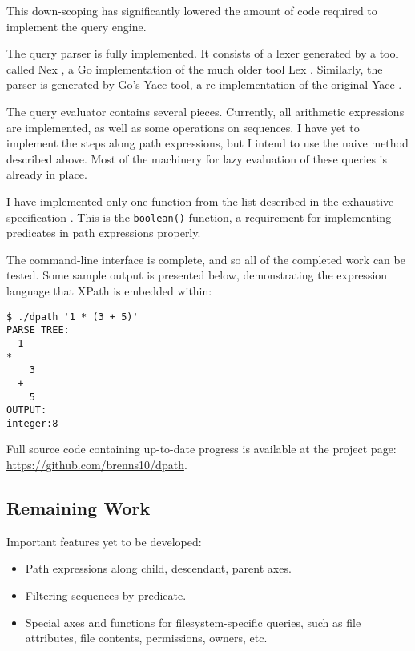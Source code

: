 \documentclass{scrartcl}
\begin{document}
This down-scoping has significantly lowered the amount of code required to
implement the query engine.

The query parser is fully implemented. It consists of a lexer generated by a
tool called Nex \cite{nex}, a Go implementation of the much older tool Lex
\cite{lex}. Similarly, the parser is generated by Go's Yacc tool, a
re-implementation of the original Yacc \cite{yacc}.

The query evaluator contains several pieces. Currently, all arithmetic
expressions are implemented, as well as some operations on sequences. I have yet
to implement the steps along path expressions, but I intend to use the naive
method described above. Most of the machinery for lazy evaluation of these
queries is already in place.

I have implemented only one function from the list described in the exhaustive
specification \cite{xpath-functions}. This is the \texttt{boolean()} function, a
requirement for implementing predicates in path expressions properly.

The command-line interface is complete, and so all of the completed work can be
tested. Some sample output is presented below, demonstrating the expression
language that XPath is embedded within:

\begin{lstlisting}
$ ./dpath '1 * (3 + 5)'
PARSE TREE:
  1
*
    3
  +
    5
OUTPUT:
integer:8
\end{lstlisting}

Full source code containing up-to-date progress is available at the project
page: \url{https://github.com/brenns10/dpath}.

\subsection{Remaining Work}
Important features yet to be developed:
\begin{itemize}
\item Path expressions along child, descendant, parent axes.
\item Filtering sequences by predicate.
\item Special axes and functions for filesystem-specific queries, such as file
  attributes, file contents, permissions, owners, etc.
\end{itemize}



\end{document}
